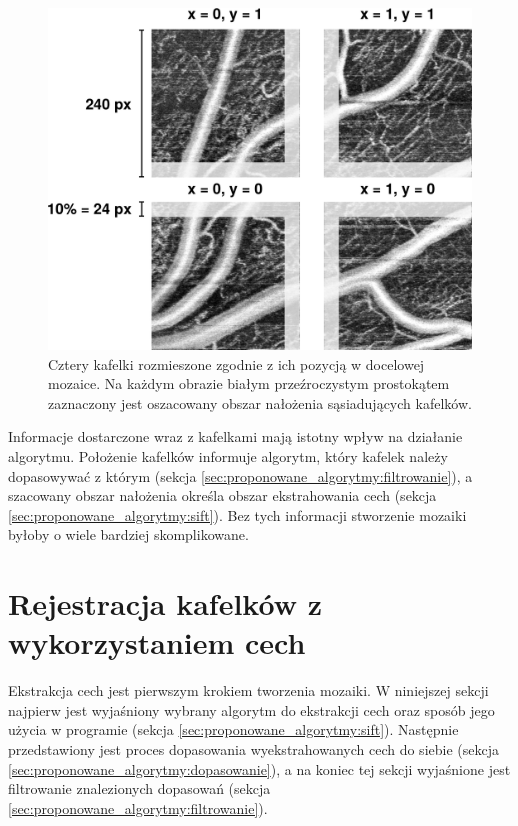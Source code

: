 \begin{figure}[H]
  \centering
  \includegraphics[width=\textwidth]{gfx/example}
  \caption{Cztery kafelki rozmieszone zgodnie z ich pozycją w docelowej mozaice. Na każdym obrazie białym przeźroczystym prostokątem zaznaczony jest oszacowany obszar nałożenia sąsiadujących kafelków.}
  \label{fig:proponowane_algorytmy:example}
\end{figure}

Informacje dostarczone wraz z kafelkami mają istotny wpływ na działanie algorytmu. Położenie kafelków informuje algorytm, który kafelek należy dopasowywać z którym (sekcja \ref{sec:proponowane_algorytmy:filtrowanie}), a szacowany obszar nałożenia określa obszar ekstrahowania cech (sekcja \ref{sec:proponowane_algorytmy:sift}). Bez tych informacji stworzenie mozaiki byłoby o wiele bardziej skomplikowane.

\section{Rejestracja kafelków z wykorzystaniem cech}
\label{sec:proponowane_algorytmy:cechy}

Ekstrakcja cech jest pierwszym krokiem tworzenia mozaiki. W niniejszej sekcji najpierw jest wyjaśniony wybrany algorytm do ekstrakcji cech oraz sposób jego użycia w programie (sekcja \ref{sec:proponowane_algorytmy:sift}). Następnie przedstawiony jest proces dopasowania wyekstrahowanych cech do siebie (sekcja \ref{sec:proponowane_algorytmy:dopasowanie}), a na koniec tej sekcji wyjaśnione jest filtrowanie znalezionych dopasowań (sekcja \ref{sec:proponowane_algorytmy:filtrowanie}).

